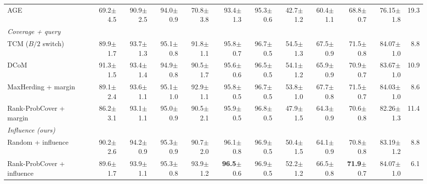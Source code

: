 \begin{table}[t]
\begin{adjustbox}{max width=\textwidth}
\begin{tabular}{lrrrrrrrrrrr}
\quad AGE~\cite{cai2017active} & 69.2{\scriptsize$\pm$4.5} & 90.9{\scriptsize$\pm$2.5} & 94.0{\scriptsize$\pm$0.9} & 70.8{\scriptsize$\pm$3.8} & 93.4{\scriptsize$\pm$1.3} & 95.3{\scriptsize$\pm$0.6} & 42.7{\scriptsize$\pm$1.2} & 60.4{\scriptsize$\pm$1.1} & 68.8{\scriptsize$\pm$0.7} & 76.15{\scriptsize$\pm$1.8} & 19.3 \\
\multicolumn{12}{l}{\textit{Coverage + query}} \\
\quad TCM ($B/2$ switch)~\cite{doucet2024bridging} & 89.9{\scriptsize$\pm$1.7} & 93.7{\scriptsize$\pm$1.3} & 95.1{\scriptsize$\pm$0.8} & 91.8{\scriptsize$\pm$1.1} & 95.8{\scriptsize$\pm$0.7} & 96.7{\scriptsize$\pm$0.5} & 54.5{\scriptsize$\pm$1.3} & 67.5{\scriptsize$\pm$0.9} & 71.5{\scriptsize$\pm$0.8} & 84.07{\scriptsize$\pm$1.0} & 8.8 \\
\quad DCoM~\cite{mishal2024dcom} & 91.3{\scriptsize$\pm$1.5} & 93.4{\scriptsize$\pm$1.4} & 94.9{\scriptsize$\pm$0.8} & 90.5{\scriptsize$\pm$1.7} & 95.6{\scriptsize$\pm$0.6} & 96.5{\scriptsize$\pm$0.5} & 54.1{\scriptsize$\pm$1.2} & 65.9{\scriptsize$\pm$0.9} & 70.9{\scriptsize$\pm$0.7} & 83.67{\scriptsize$\pm$1.0} & 10.9 \\
\quad MaxHerding + margin & 89.1{\scriptsize$\pm$2.4} & 93.6{\scriptsize$\pm$1.1} & 95.1{\scriptsize$\pm$1.0} & 92.9{\scriptsize$\pm$1.1} & 95.8{\scriptsize$\pm$0.5} & 96.7{\scriptsize$\pm$0.5} & 53.8{\scriptsize$\pm$1.0} & 67.7{\scriptsize$\pm$0.8} & 71.5{\scriptsize$\pm$0.7} & 84.03{\scriptsize$\pm$1.0} & 8.6 \\
\quad Rank-ProbCover + margin & 86.2{\scriptsize$\pm$3.1} & 93.1{\scriptsize$\pm$1.1} & 95.0{\scriptsize$\pm$0.9} & 90.5{\scriptsize$\pm$2.1} & 95.9{\scriptsize$\pm$0.5} & 96.8{\scriptsize$\pm$0.5} & 47.9{\scriptsize$\pm$1.5} & 64.3{\scriptsize$\pm$0.9} & 70.6{\scriptsize$\pm$0.8} & 82.26{\scriptsize$\pm$1.3} & 11.4 \\
\multicolumn{12}{l}{\textit{Influence (ours)}} \\
\quad Random + influence & 90.2{\scriptsize$\pm$2.6} & 94.2{\scriptsize$\pm$0.9} & 95.3{\scriptsize$\pm$0.9} & 90.7{\scriptsize$\pm$2.0} & 96.1{\scriptsize$\pm$0.8} & 96.9{\scriptsize$\pm$0.5} & 50.4{\scriptsize$\pm$1.5} & 64.1{\scriptsize$\pm$0.9} & 70.8{\scriptsize$\pm$0.8} & 83.19{\scriptsize$\pm$1.2} & 8.8 \\
\quad Rank-ProbCover + influence & 89.6{\scriptsize$\pm$1.7} & 93.9{\scriptsize$\pm$1.1} & 95.3{\scriptsize$\pm$0.8} & 93.9{\scriptsize$\pm$1.2} & \textbf{96.5}{\scriptsize$\pm$0.6} & 96.9{\scriptsize$\pm$0.5} & 52.2{\scriptsize$\pm$1.2} & 66.5{\scriptsize$\pm$0.8} & \textbf{71.9}{\scriptsize$\pm$0.7} & 84.07{\scriptsize$\pm$1.0} & 6.1 \\

\end{tabular}
\end{adjustbox}
\end{table}
